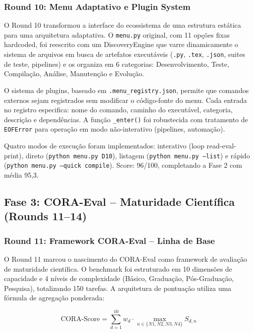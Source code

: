 \subsubsection{Round 10: Menu Adaptativo e Plugin System}

O Round 10 transformou a interface do ecossistema de uma estrutura
estática para uma arquitetura adaptativa. O \texttt{menu.py} original,
com 11 opções fixas hardcoded, foi reescrito com um DiscoveryEngine que
varre dinamicamente o sistema de arquivos em busca de artefatos
executáveis (\texttt{.py}, \texttt{.tex}, \texttt{.json}, suites de teste,
pipelines) e os organiza em 6 categorias: Desenvolvimento, Teste,
Compilação, Análise, Manutenção e Evolução.

O sistema de plugins, baseado em \texttt{.menu\_registry.json}, permite
que comandos externos sejam registrados sem modificar o código-fonte do
menu. Cada entrada no registro especifica: nome do comando, caminho do
executável, categoria, descrição e dependências. A função
\texttt{\_enter()} foi robustecida com tratamento de \texttt{EOFError}
para operação em modo não-interativo (pipelines, automação).

Quatro modos de execução foram implementados: interativo (loop
read-eval-print), direto (\texttt{python menu.py D10}), listagem
(\texttt{python menu.py --list}) e rápido (\texttt{python menu.py
--quick compile}). Score: 96/100, completando a Fase 2 com média 95,3.

\subsection{Fase 3: CORA-Eval -- Maturidade Científica (Rounds 11--14)}

\subsubsection{Round 11: Framework CORA-Eval -- Linha de Base}

O Round 11 marcou o nascimento do CORA-Eval como framework de avaliação
de maturidade científica. O benchmark foi estruturado em 10 dimensões de
capacidade e 4 níveis de complexidade (Básico, Graduação,
Pós-Graduação, Pesquisa), totalizando 150 tarefas. A arquitetura de
pontuação utiliza uma fórmula de agregação ponderada:

\begin{equation}
\text{CORA-Score} = \sum_{d=1}^{10} w_d \cdot \max_{n \in \{N1,N2,N3,N4\}} S_{d,n}
\end{equation}

